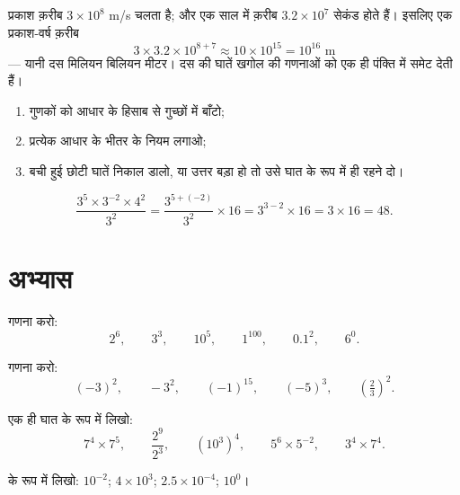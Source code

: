 \begin{example}[कोटि-क्रम]\label{ex:g8:powers:magnitude}
प्रकाश क़रीब $3 \times 10^8$ m/s चलता है; और एक साल में क़रीब
$3.2 \times 10^7$ सेकंड होते हैं। इसलिए एक प्रकाश-वर्ष क़रीब
\[
3 \times 3.2 \times 10^{8+7} \approx 10 \times 10^{15} = 10^{16}
\text{ m}
\]
--- यानी दस मिलियन बिलियन मीटर। दस की घातें खगोल की गणनाओं को एक ही
पंक्ति में समेट देती हैं।
\end{example}

\begin{method}\label{met:g8:powers:simplify}
\begin{enumerate}
  \item गुणकों को आधार के हिसाब से गुच्छों में बाँटो;
  \item प्रत्येक आधार के भीतर  के नियम लगाओ;
  \item बची हुई छोटी घातें निकाल डालो, या उत्तर बड़ा हो तो उसे घात
        के रूप में ही रहने दो।
\end{enumerate}
\end{method}

\begin{example}\label{ex:g8:powers:simplify}
\[
\frac{3^5 \times 3^{-2} \times 4^2}{3^2}
= \frac{3^{5 + (-2)}}{3^2} \times 16
= 3^{3 - 2} \times 16
= 3 \times 16 = 48 .
\]
\end{example}

\section{अभ्यास}

\begin{exercise}[$\star$]\label{exo:g8:powers:1}
गणना करो:
\[
2^6, \qquad 3^3, \qquad 10^5, \qquad 1^{100}, \qquad 0.1^2, \qquad
6^0 .
\]
\end{exercise}

\begin{exercise}[$\star$]\label{exo:g8:powers:2}
गणना करो:
\[
(-3)^2, \qquad -3^2, \qquad (-1)^{15}, \qquad (-5)^3, \qquad
\left(\tfrac{2}{3}\right)^2 .
\]
\end{exercise}

\begin{exercise}[$\star$]\label{exo:g8:powers:3}
एक ही घात के रूप में लिखो:
\[
7^4 \times 7^5, \qquad
\frac{2^9}{2^3}, \qquad
\left(10^3\right)^4, \qquad
5^6 \times 5^{-2}, \qquad
3^4 \times 7^4 .
\]
\end{exercise}

\begin{exercise}[$\star$]\label{exo:g8:powers:4}
 के रूप में लिखो: $10^{-2}$; \quad $4 \times 10^3$;
\quad $2.5 \times 10^{-4}$; \quad $10^0$।
\end{exercise}

